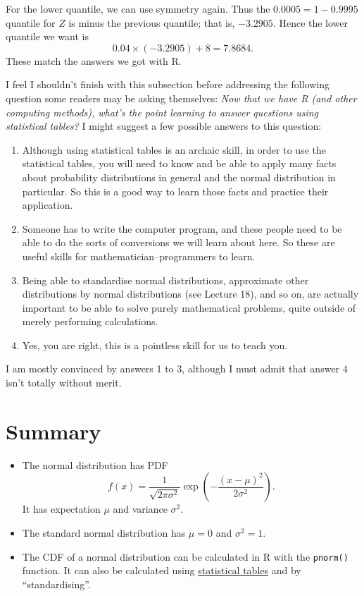 \documentclass[
  a4paper,
]{book}
\providecommand{\tightlist}{%
  \setlength{\itemsep}{0pt}\setlength{\parskip}{0pt}}
\theoremstyle{definition}
\theoremstyle{definition}
\theoremstyle{definition}
\theoremstyle{definition}
\theoremstyle{remark}
\begin{document}
For the lower quantile, we can use symmetry again. Thus the \(0.0005 = 1 - 0.9995\) quantile for \(Z\) is minus the previous quantile; that is, \(-3.2905\). Hence the lower quantile we want is
\[0.04\times (-3.2905) + 8 = 7.8684. \]
These match the answers we got with R.

I feel I shouldn't finish with this subsection before addressing the following question some readers may be asking themselves: \emph{Now that we have R (and other computing methods), what's the point learning to answer questions using statistical tables?} I might suggest a few possible answers to this question:

\begin{enumerate}
\def\labelenumi{\arabic{enumi}.}
\tightlist
\item
  Although using statistical tables is an archaic skill, in order to use the statistical tables, you will need to know and be able to apply many facts about probability distributions in general and the normal distribution in particular. So this is a good way to learn those facts and practice their application.
\item
  Someone has to write the computer program, and these people need to be able to do the sorts of conversions we will learn about here. So these are useful skills for mathematician--programmers to learn.
\item
  Being able to standardise normal distributions, approximate other distributions by normal distributions (see Lecture 18), and so on, are actually important to be able to solve purely mathematical problems, quite outside of merely performing calculations.
\item
  Yes, you are right, this is a pointless skill for us to teach you.
\end{enumerate}

I am mostly convinced by answers 1 to 3, although I must admit that answer 4 isn't totally without merit.

\hypertarget{summary-L16}{%
\section*{Summary}\label{summary-L16}}

\begin{itemize}
\tightlist
\item
  The normal distribution has PDF
  \[ f(x) = \frac{1}{\sqrt{2\pi\sigma^2}} \exp \left(- \frac{(x - \mu)^2}{2\sigma^2} \right) .\]
  It has expectation \(\mu\) and variance \(\sigma^2\).
\item
  The standard normal distribution has \(\mu = 0\) and \(\sigma^2 = 1\).
\item
  The CDF of a normal distribution can be calculated in R with the \texttt{pnorm()} function. It can also be calculated using \href{https://mpaldridge.github.io/math1710/stat-tab.pdf}{statistical tables} and by ``standardising''.
\end{itemize}
\end{document}
